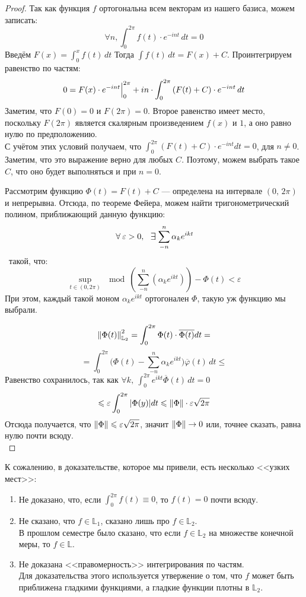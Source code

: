 \documentclass[12pt]{article}
\begin{document}
		\begin{proof}
			Так как функция $f$ ортогональна всем векторам из нашего базиса, можем записать:
			$$ \forall n, \int_0^{2\pi} f(t) \cdot e^{-int} \,dt = 0 $$
			Введём $F(x) = \int_0^x f(t) \,dt$ Тогда $\int f(t) \,dt = F(x) + C$. Проинтегрируем равенство по частям:
			$$ 0 = F(x) \cdot e^{-int} \Big|_{0}^{2\pi} 
			   + i n \cdot \int_0^{2\pi} \left(F(t) + C\right) \cdot e^{-int} \,dt $$
			Заметим, что $F(0) = 0$ и $F(2\pi) = 0$. Второе равенство имеет место, поскольку $F(2\pi)$ является 
		    скалярным произведением $f(x)$ и $1$, а оно равно нулю по предположению. \\
			С учётом этих условий получаем, что $\int_0^{2\pi} (F(t) + C) \cdot e^{-int} dt = 0$, для $n \neq 0$. 
			Заметим, что это выражение верно для любых $C$. Поэтому, можем выбрать такое $C$, что оно будет
			выполняться и при $n = 0$.
		
			Рассмотрим функцию $\Phi(t) = F(t) + C$ --- определена на интервале $(0,\, 2\pi)$ и непрерывна.
			Отсюда, по теореме Фейера, можем найти тригонометрический полином, приближающий данную функцию:
			$$\forall \varepsilon > 0,\, \:\Exists\! \sum_{-n}^n \alpha_k e^{ikt}$$\
			такой, что:
			$$ \underset{t \in (0,2\pi)}{\sup} \mod{(\sum_{-n}^n (\alpha_k e^{ikt})) - \Phi(t)} < \varepsilon $$
			При этом, каждый такой моном $\alpha_k e^{ikt}$ ортогонален $\Phi$, такую уж функцию мы выбрали.
		
			$$ \left\| \Phi(t) \right\|^2_{\mathbb{L}_2} = \int_0^{2\pi} \Phi(t) \cdot \overline{\Phi(t)} dt = $$
			$$ = \int_0^{2\pi}\Big(\Phi(t) - \sum_{-n}^n \alpha_k e^{ikt}\Big)\overline{\varphi}(t) \,dt \leq $$
			Равенство сохранилось, так как $\forall k,\: \int_0^{2\pi}e^{ikt}\overline{\Phi}(t) \,dt = 0$
			$$ \leqslant \varepsilon \int_0^{2\pi} | \Phi(y) | dt \leqslant \left\| \Phi \right\| \cdot \varepsilon\sqrt{2\pi} $$
			Отсюда получается, что $\left\| \Phi \right\| \leqslant \varepsilon \sqrt{2\pi}$, значит $\left\| \Phi \right\| \rightarrow 0$ или, точнее сказать,
			равна нулю почти всюду.\\
		\end{proof}
	
		К сожалению, в доказательстве, которое мы привели, есть несколько <<узких мест>>:
		\begin{enumerate}
			\item Не доказано, что, если $\int_0^{2\pi} f(t) \equiv 0$, то $f(t) = 0$ почти всюду.
			\item Не сказано, что $f \in \mathbb{L}_1$, сказано лишь про $f \in \mathbb{L}_2$. \\
			В прошлом семестре было сказано, что если $f \in \mathbb{L}_2$ на множестве конечной меры, то $f \in \mathbb{L}$.
			\item Не доказана <<правомерность>> интегрирования по частям. \\
			Для доказательства этого используется утвержение о том, что $f$ может быть приближена гладкими функциями, а
			гладкие функции плотны в $\mathbb{L}_2$.
		\end{enumerate}
	
\end{document}
